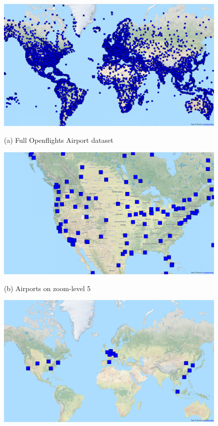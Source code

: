 \documentclass[11pt, oneside]{report}
\begin{document}
{\begin{figure}[tb]
  \begin{minipage}{0.329\linewidth}
    \centerline{\includegraphics[width=0.95\linewidth]{./figs-cvl/airports.png}}
    \centerline{(a) Full Openflights Airport dataset}
  \end{minipage} \hfill
  \begin{minipage}{0.329\linewidth}
    \centerline{\includegraphics[width=0.95\linewidth]{./figs-cvl/airports_z4.png}}
    \centerline{(b) Airports on zoom-level 5}
  \end{minipage} \hfill
  \begin{minipage}{0.329\linewidth}
    \centerline{\includegraphics[width=0.95\linewidth]{./figs-cvl/airports_z0.png}}

\end{minipage}
\end{figure}}
\end{document}
